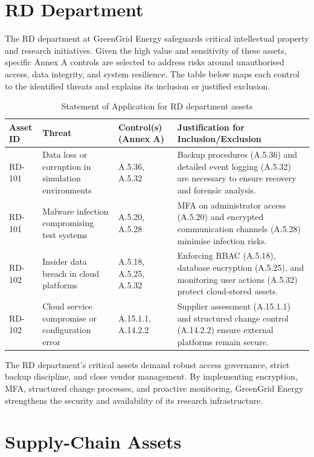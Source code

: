 \section{\ac{RD} Department}

The \ac{RD} department at GreenGrid Energy safeguards critical intellectual property and research initiatives.  
Given the high value and sensitivity of these assets, specific Annex A controls are selected to address risks around unauthorised access, data integrity, and system resilience.  
The table below maps each control to the identified threats and explains its inclusion or justified exclusion.

\begin{longtable}{|p{2cm}|p{4cm}|p{4.5cm}|p{4cm}|}
    \caption{Statement of Application for RD department assets}
    \label{tab:rd-soa}\\
    \hline
    \textbf{Asset ID} & \textbf{Threat} & \textbf{Control(s)\,(Annex A)} & \textbf{Justification for Inclusion/Exclusion} \\
    \hline
    \endhead
    RD-101 & Data loss or corruption in simulation environments & A.5.36, A.5.32 & Backup procedures (A.5.36) and detailed event logging (A.5.32) are necessary to ensure recovery and forensic analysis. \\
    \hline
    RD-101 & Malware infection compromising test systems & A.5.20, A.5.28 & \ac{MFA} on administrator access (A.5.20) and encrypted communication channels (A.5.28) minimise infection risks. \\
    \hline
    RD-102 & Insider data breach in cloud platforms & A.5.18, A.5.25, A.5.32 & Enforcing RBAC (A.5.18), database encryption (A.5.25), and monitoring user actions (A.5.32) protect cloud-stored assets. \\
    \hline
    RD-102 & Cloud service compromise or configuration error & A.15.1.1, A.14.2.2 & Supplier assessment (A.15.1.1) and structured change control (A.14.2.2) ensure external platforms remain secure. \\
    \hline
\end{longtable}

The \ac{RD} department’s critical assets demand robust access governance, strict backup discipline, and close vendor management.  
By implementing encryption, \ac{MFA}, structured change processes, and proactive monitoring, GreenGrid Energy strengthens the security and availability of its research infrastructure.

\section{Supply-Chain Assets}

